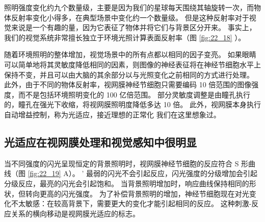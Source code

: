照明强度变化约九个数量级，主要是因为我们的星球每天围绕其轴旋转一次，而物体反射率变化小得多，在典型场景中变化约一个数量级。
但是这种反射率对于视觉来说是一个有趣的量，因为它表征了物体并将它们与背景区分开来。 
事实上，我们的视觉系统非常擅长独立于环境光照计算表面反射率（图 \ref{fig:22_18} ）。


随着环境照明的整体增加，视觉场景中的所有点都以相同的因子变亮。 
如果眼睛可以简单地将其灵敏度降低相同的因素，则图像的神经表征将在神经节细胞水平上保持不变，并且可以由大脑的其余部分以与光照变化之前相同的方式进行处理。 
此外，由于不同的物体反射率，视网膜神经节细胞只需要编码 10 倍范围的图像强度，而不是包括环境照明变化的 100 亿倍范围。 
部分灵敏度调整是由瞳孔执行的，瞳孔在强光下收缩，将视网膜照明度降低多达 10 倍。
此外，视网膜本身执行自动增益控制，称为光适应，接近理想的正常化 我们在这里想象过。


\subsection{光适应在视网膜处理和视觉感知中很明显}
当不同强度的闪光呈现恒定的背景照明时，视网膜神经节细胞的反应符合 S 形曲线（图 \ref{fig:22_19} A）。 '
最弱的闪光不会引起反应，闪光强度的分级增加会引起分级反应，最亮的闪光会引起饱和。 
当背景照明增加时，响应曲线保持相同的形状，但转向更高的闪光强度。 
为了补偿背景照明的增加，神经节细胞现在对光变化不太敏感：在较高背景下，需要更大的变化才能引起相同的反应。 
这种刺激-反应关系的横向移动是视网膜光适应的标志。

